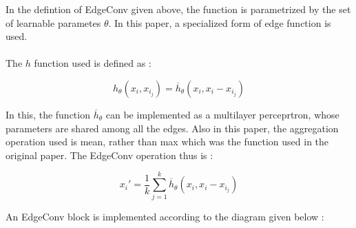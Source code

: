 \noindent In the defintion of EdgeConv given above, the function is  parametrized by the set of learnable parametes $\theta$. In this paper, a  specialized form of edge function is used.

\paragraph{} The $h$ function used is defined as :

\begin{equation*}
    h_\theta(x_i,x_{i_j}) = \overline{h}_\theta(x_i,x_i - x_{i_j})
\end{equation*}

\noindent In this, the function $\overline{h}_\theta$ can be implemented as a  multilayer perceprtron, whose parameters are shared among all the edges. Also  in this paper, the aggregation operation used is mean, rather than max which was the function used in the original paper. The EdgeConv operation thus is :

\begin{equation*}
    x_i' = \frac{1}{k} \sum_{j=1}^k \overline{h}_\theta(x_i,x_i - x_{i_j})
\end{equation*}

\noindent An EdgeConv block is implemented according to the diagram given below :

